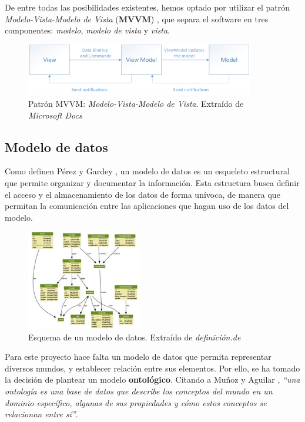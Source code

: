De entre todas las posibilidades existentes, hemos optado por utilizar el patrón \textit{Modelo-Vista-Modelo de Vista} (\textbf{MVVM})
\autocite*{MicrosoftMVVM}, que separa el software en tres componentes: \textit{modelo}, \textit{modelo de vista} y \textit{vista}.\medskip

\begin{figure}[H]
    \centering
    \includegraphics[width=10cm]{Images/mvvm.png}
    \caption{Patrón MVVM: \textit{Modelo-Vista-Modelo de Vista}. \smallskip Extraído de \textit{Microsoft Docs} \autocite*{MicrosoftMVVM}}
\end{figure}

\subsection{Modelo de datos} \label{Modelo_Datos}
Como definen Pérez y Gardey \autocite*{Perez2017}, un modelo de datos es un esqueleto estructural que permite organizar 
y documentar la información. Esta estructura busca definir el acceso y el almacenamiento de los datos de forma 
unívoca, de manera que permitan la comunicación entre las aplicaciones que hagan uso de los datos del modelo. \medskip

\begin{figure}[H]
    \centering
    \includegraphics[width=5cm]{Figures/modelo_datos.jpg}
    \caption{Esquema de un modelo de datos. Extraído de \textit{definición.de} \autocite*{Perez2017}}
\end{figure}

Para este proyecto hace falta un modelo de datos que permita representar diversos mundos, y establecer relación entre sus elementos.
Por ello, se ha tomado la decisión de plantear un modelo \textbf{ontológico}. Citando a Muñoz y Aguilar \autocite*{Munoz2009}, 
\textit{“una ontología es una base de datos que describe los conceptos del mundo en un dominio específico, algunas de sus 
propiedades y cómo estos conceptos se relacionan entre sí”}. \autocite*{Munoz2009}
 
